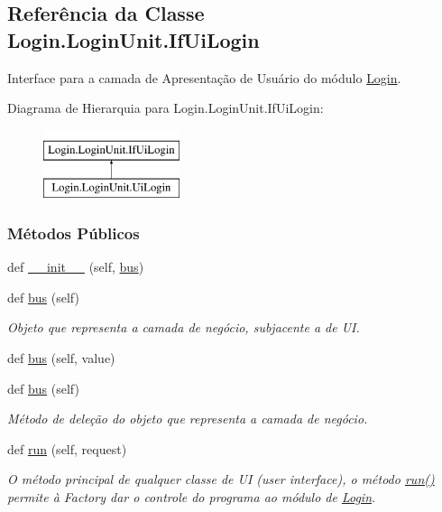 \hypertarget{classLogin_1_1LoginUnit_1_1IfUiLogin}{}\subsection{Referência da Classe Login.\+Login\+Unit.\+If\+Ui\+Login}
\label{classLogin_1_1LoginUnit_1_1IfUiLogin}


Interface para a camada de Apresentação de Usuário do módulo \hyperlink{namespaceLogin}{Login}.  


Diagrama de Hierarquia para Login.\+Login\+Unit.\+If\+Ui\+Login\+:\begin{figure}[H]
\begin{center}
\leavevmode
\includegraphics[height=2.000000cm]{d9/d56/classLogin_1_1LoginUnit_1_1IfUiLogin}
\end{center}
\end{figure}
\subsubsection*{Métodos Públicos}
\begin{DoxyCompactItemize}
\item 
def \hyperlink{classLogin_1_1LoginUnit_1_1IfUiLogin_aae35610e0613da11d8fcdd3d0aa20c52}{\+\_\+\+\_\+init\+\_\+\+\_\+} (self, \hyperlink{classLogin_1_1LoginUnit_1_1IfUiLogin_af6823ae4c77d340c2341932d8f338753}{bus})
\item 
def \hyperlink{classLogin_1_1LoginUnit_1_1IfUiLogin_afe73a7a4e5feecf81ef4b7594bdefd2e}{bus} (self)
\begin{DoxyCompactList}\small\item\em Objeto que representa a camada de negócio, subjacente a de U\+I. \end{DoxyCompactList}\item 
def \hyperlink{classLogin_1_1LoginUnit_1_1IfUiLogin_a9a0b020515b3929803dcbd7d889e9cf9}{bus} (self, value)
\item 
def \hyperlink{classLogin_1_1LoginUnit_1_1IfUiLogin_afe73a7a4e5feecf81ef4b7594bdefd2e}{bus} (self)
\begin{DoxyCompactList}\small\item\em Método de deleção do objeto que representa a camada de negócio. \end{DoxyCompactList}\item 
def \hyperlink{classLogin_1_1LoginUnit_1_1IfUiLogin_a783eccf84b36655d28da48159efd01cb}{run} (self, request)
\begin{DoxyCompactList}\small\item\em O método principal de qualquer classe de U\+I (user interface), o método \hyperlink{classLogin_1_1LoginUnit_1_1IfUiLogin_a783eccf84b36655d28da48159efd01cb}{run()} permite à Factory dar o controle do programa ao módulo de \hyperlink{namespaceLogin}{Login}. \end{DoxyCompactList}\end{DoxyCompactItemize}
